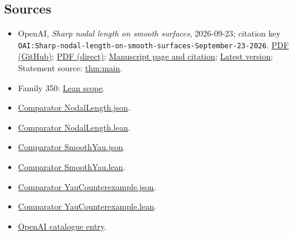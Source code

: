 \documentclass[11pt]{article}
\begin{document}
\subsection{Sources}
\begin{itemize}
\item OpenAI, \emph{Sharp nodal length on smooth surfaces}, 2026-09-23; citation key \texttt{OAI:Sharp-nodal-length-on-smooth-surfaces-September-23-2026}. \href{https://github.com/openai/math/blob/adc7f1241b42e322a6451854ab7e4b4c146bf78a/preprints/Sharp-nodal-length-on-smooth-surfaces-September-23-2026/paper.pdf}{PDF (GitHub)}; \href{https://github.com/openai/math/raw/adc7f1241b42e322a6451854ab7e4b4c146bf78a/preprints/Sharp-nodal-length-on-smooth-surfaces-September-23-2026/paper.pdf}{PDF (direct)}; \href{https://github.com/openai/math/blob/adc7f1241b42e322a6451854ab7e4b4c146bf78a/preprints/Sharp-nodal-length-on-smooth-surfaces-September-23-2026/README.md}{Manuscript page and citation}; \href{https://github.com/openai/math/blob/main/preprints/Sharp-nodal-length-on-smooth-surfaces-September-23-2026/paper.pdf}{Latest version}; Statement source: \href{https://github.com/openai/math/blob/adc7f1241b42e322a6451854ab7e4b4c146bf78a/preprints/Sharp-nodal-length-on-smooth-surfaces-September-23-2026/build/introduction.tex\#L7}{thm:main}.
\item Family 350: \href{https://github.com/openai/math/blob/adc7f1241b42e322a6451854ab7e4b4c146bf78a/lean/docs/350.md}{Lean scope}.
\item \href{https://github.com/openai/math/blob/adc7f1241b42e322a6451854ab7e4b4c146bf78a/lean/ComparatorChallenges/NodalLength.json}{Comparator NodalLength.json}.
\item \href{https://github.com/openai/math/blob/adc7f1241b42e322a6451854ab7e4b4c146bf78a/lean/ComparatorChallenges/NodalLength.lean}{Comparator NodalLength.lean}.
\item \href{https://github.com/openai/math/blob/adc7f1241b42e322a6451854ab7e4b4c146bf78a/lean/ComparatorChallenges/SmoothYau.json}{Comparator SmoothYau.json}.
\item \href{https://github.com/openai/math/blob/adc7f1241b42e322a6451854ab7e4b4c146bf78a/lean/ComparatorChallenges/SmoothYau.lean}{Comparator SmoothYau.lean}.
\item \href{https://github.com/openai/math/blob/adc7f1241b42e322a6451854ab7e4b4c146bf78a/lean/ComparatorChallenges/YauCounterexample.json}{Comparator YauCounterexample.json}.
\item \href{https://github.com/openai/math/blob/adc7f1241b42e322a6451854ab7e4b4c146bf78a/lean/ComparatorChallenges/YauCounterexample.lean}{Comparator YauCounterexample.lean}.
\item \href{https://github.com/openai/math/blob/adc7f1241b42e322a6451854ab7e4b4c146bf78a/CONTENTS.md}{OpenAI catalogue entry}.
\end{itemize}
\end{document}
